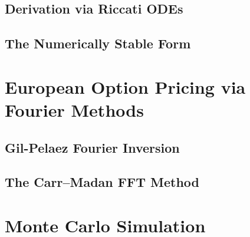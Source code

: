 \documentclass[11pt, a4paper]{article}
\numberwithin{equation}{subsection}
\numberwithin{definition}{subsection}
\numberwithin{theorem}{subsection}
\numberwithin{remark}{subsection}
\begin{document}
\subsection{Derivation via Riccati ODEs}

\subsection{The Numerically Stable Form}


\section{European Option Pricing via Fourier Methods}

\subsection{Gil-Pelaez Fourier Inversion}

\subsection{The Carr--Madan FFT Method}


\section{Monte Carlo Simulation}
\end{document}
